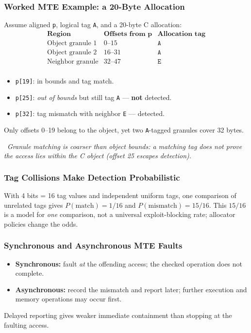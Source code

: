 \documentclass[hidelinks]{article}
\newcommand{\callout}[1]{\par\smallskip\noindent{\color{capri}$\blacktriangleright$}\ \textit{#1}\par\smallskip}
\begin{document}
\subsubsection{Worked MTE Example: a 20-Byte Allocation}

Assume aligned \texttt{p}, logical tag \texttt{A}, and a 20-byte C allocation:
\[
\begin{array}{lll}
\textbf{Region} & \textbf{Offsets from p} & \textbf{Allocation tag}\\ \hline
\text{Object granule 1} & 0\text{--}15  & \texttt{A}\\
\text{Object granule 2} & 16\text{--}31 & \texttt{A}\\
\text{Neighbor granule}  & 32\text{--}47 & \texttt{E}\\
\end{array}
\]
\begin{itemize}
    \item \texttt{p[19]}: in bounds and tag match.
    \item \texttt{p[25]}: \emph{out of bounds} but still tag \texttt{A} --- \textbf{not} detected.
    \item \texttt{p[32]}: tag mismatch with neighbor \texttt{E} --- detected.
\end{itemize}
Only offsets 0--19 belong to the object, yet two \texttt{A}-tagged granules cover 32 bytes.

\callout{Granule matching is \emph{coarser} than object bounds: a matching tag does not prove the access lies within the C object (offset 25 escapes detection).}

\subsubsection{Tag Collisions Make Detection Probabilistic}

With 4 bits = 16 tag values and independent uniform tags, one comparison of unrelated tags gives $P(\text{match}) = 1/16$ and $P(\text{mismatch}) = 15/16$. This $15/16$ is a model for \emph{one} comparison, not a universal exploit-blocking rate; allocator policies change the odds.

\subsubsection{Synchronous and Asynchronous MTE Faults}

\begin{itemize}
    \item \textbf{Synchronous:} fault \emph{at} the offending access; the checked operation does not complete.
    \item \textbf{Asynchronous:} record the mismatch and report later; further execution and memory operations may occur first.
\end{itemize}
Delayed reporting gives weaker immediate containment than stopping at the faulting access.
\end{document}
